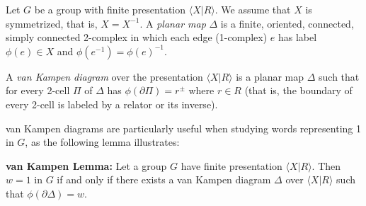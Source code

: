 \documentclass[12pt]{article}
\newcommand{\vs}{\vskip10pt}
\begin{document}
	\vs 
	
	Let $G$ be a group with finite presentation $\langle X \vert R \rangle$. We assume that $X$ is symmetrized, that is, $X = X^{-1}$. A \textit{planar map} $\Delta$ is a finite, oriented, connected, simply connected 2-complex in which each edge (1-complex) $e$ has label $\phi(e) \in X$ and $\phi(e^{-1}) = \phi(e)^{-1}$. 
	
	\vs
	
	A \textit{van Kampen diagram} over the presentation $\langle X \vert R \rangle$ is a planar map $\Delta$ such that for every 2-cell $\Pi$ of $\Delta$ has $\phi(\partial \Pi) = r^{\pm}$ where $r \in R$ (that is, the boundary of every 2-cell is labeled by a relator or its inverse). 
	
	\vs 
	
	van Kampen diagrams are particularly useful when studying words representing 1 in $G$, as the following lemma illustrates: 
	
	\vs 
	
	\textbf{van Kampen Lemma:} Let a group $G$ have finite presentation $\langle X \vert R \rangle$. Then $w = 1$ in $G$ if and only if there exists a van Kampen diagram $\Delta$ over $\langle X \vert R \rangle$ such that $\phi(\partial \Delta) = w$.
	
\end{document}

